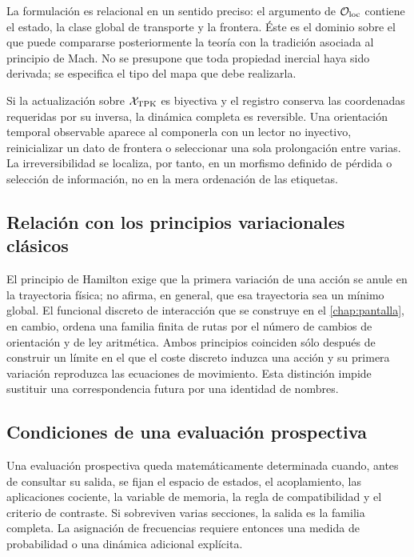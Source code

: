 La formulación es relacional en un sentido preciso: el argumento de
\(\mathcal O_{\rm loc}\) contiene el estado, la clase global de transporte y
la frontera. Éste es el dominio sobre el que puede compararse posteriormente
la teoría con la tradición asociada al principio de Mach. No se presupone que
toda propiedad inercial haya sido derivada; se especifica el tipo del mapa que
debe realizarla.

Si la actualización sobre \(\mathcal X_{\rm TPK}\) es biyectiva y el registro
conserva las coordenadas requeridas por su inversa, la dinámica completa es
reversible. Una orientación temporal observable aparece al componerla con un
lector no inyectivo, reinicializar un dato de frontera o seleccionar una sola
prolongación entre varias. La irreversibilidad se localiza, por tanto, en un
morfismo definido de pérdida o selección de información, no en la mera
ordenación de las etiquetas.

\subsection{Relación con los principios variacionales clásicos}

El principio de Hamilton exige que la primera variación de una acción se anule
en la trayectoria física; no afirma, en general, que esa trayectoria sea un
mínimo global. El funcional discreto de interacción que se construye en el
\cref{chap:pantalla}, en cambio, ordena una familia finita de rutas por el
número de cambios de orientación y de ley aritmética. Ambos principios
coinciden sólo después de construir un límite en el que el coste discreto
induzca una acción y su primera variación reproduzca las ecuaciones de
movimiento. Esta distinción impide sustituir una correspondencia futura por
una identidad de nombres.

\subsection{Condiciones de una evaluación prospectiva}

Una evaluación prospectiva queda matemáticamente determinada cuando, antes de
consultar su salida, se fijan el espacio de estados, el acoplamiento, las
aplicaciones cociente, la variable de memoria, la regla de compatibilidad y el
criterio de contraste. Si sobreviven varias secciones, la salida es la familia
completa. La asignación de frecuencias requiere entonces una medida de
probabilidad o una dinámica adicional explícita.


